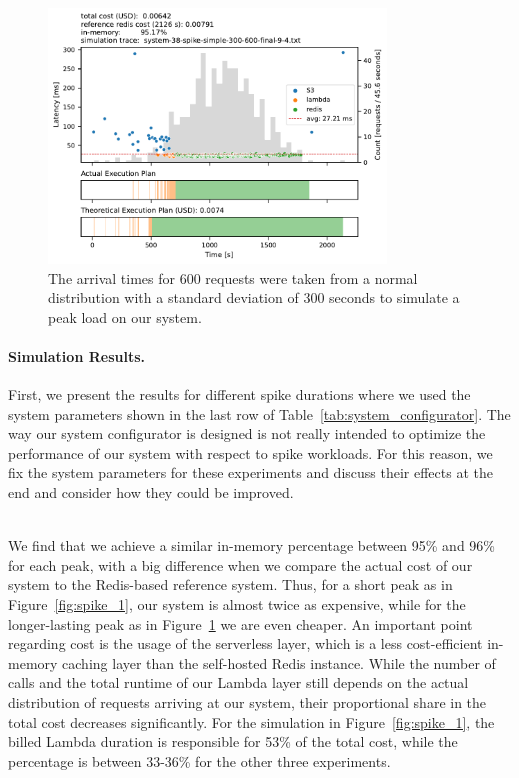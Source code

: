 \begin{figure}[t]
    \begin{center}
        \includegraphics[width=0.8\textwidth]{figures/system-38-spike-simple-300-600-final-9-4.pdf}
        \caption{The arrival times for 600 requests were taken from a normal distribution with a standard deviation of 300 seconds to simulate a peak load on our system.}
        \label{fig:spike_4}
    \end{center}
\end{figure}

\paragraph{Simulation Results.}
First, we present the results for different spike durations where we used the system parameters shown in the last row of Table~\ref{tab:system_configurator}. The way our system configurator is designed is not really intended to optimize the performance of our system with respect to spike workloads. For this reason, we fix the system parameters for these experiments and discuss their effects at the end and consider how they could be improved. 

~\\
We find that we achieve a similar in-memory percentage between 95\% and 96\% for each peak, with a big difference when we compare the actual cost of our system to the Redis-based reference system. Thus, for a short peak as in Figure~\ref{fig:spike_1}, our system is almost twice as expensive, while for the longer-lasting peak as in Figure~\ref{fig:spike_4} we are even cheaper. An important point regarding cost is the usage of the serverless layer, which is a less cost-efficient in-memory caching layer than the self-hosted Redis instance. While the number of calls and the total runtime of our Lambda layer still depends on the actual distribution of requests arriving at our system, their proportional share in the total cost decreases significantly. For the simulation in Figure~\ref{fig:spike_1}, the billed Lambda duration is responsible for 53\% of the total cost, while the percentage is between 33-36\% for the other three experiments. 

